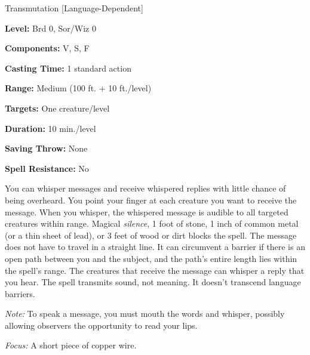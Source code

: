 
Transmutation [Language-Dependent]

\textbf{Level:} Brd 0, Sor/Wiz 0

\textbf{Components:} V, S, F

\textbf{Casting Time:} 1 standard action

\textbf{Range:} Medium (100 ft. + 10 ft./level)

\textbf{Targets:} One creature/level

\textbf{Duration:} 10 min./level

\textbf{Saving Throw:} None

\textbf{Spell Resistance:} No

You can whisper messages and receive whispered replies with little chance of being 
overheard. You point your finger at each creature you want to receive the message. 
When you whisper, the whispered message is audible to all targeted creatures within 
range. Magical \textit{silence}, 1 foot of stone, 1 inch of common metal (or a 
thin sheet of lead), or 3 feet of wood or dirt blocks the spell. The message does 
not have to travel in a straight line. It can circumvent a barrier if there is 
an open path between you and the subject, and the path's entire length lies within 
the spell's range. The creatures that receive the message can whisper a reply that 
you hear. The spell transmits sound, not meaning. It doesn't transcend language 
barriers.

\textit{Note:} To speak a message, you must mouth the words and whisper, possibly 
allowing observers the opportunity to read your lips.

\textit{Focus:} A short piece of copper wire.


